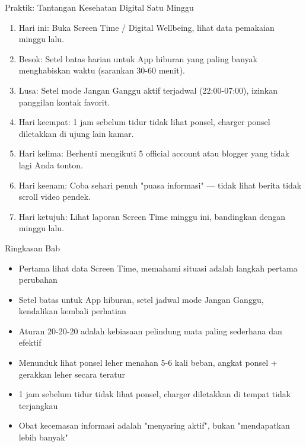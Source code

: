 \begin{tcbpractice}{Praktik: Tantangan Kesehatan Digital Satu Minggu}
\begin{enumerate}
  \item Hari ini: Buka Screen Time / Digital Wellbeing, lihat data pemakaian minggu lalu.
  \item Besok: Setel batas harian untuk App hiburan yang paling banyak menghabiskan waktu (sarankan 30-60 menit).
  \item Lusa: Setel mode Jangan Ganggu aktif terjadwal (22:00-07:00), izinkan panggilan kontak favorit.
  \item Hari keempat: 1 jam sebelum tidur tidak lihat ponsel, charger ponsel diletakkan di ujung lain kamar.
  \item Hari kelima: Berhenti mengikuti 5 official account atau blogger yang tidak lagi Anda tonton.
  \item Hari keenam: Coba sehari penuh "puasa informasi" — tidak lihat berita tidak scroll video pendek.
  \item Hari ketujuh: Lihat laporan Screen Time minggu ini, bandingkan dengan minggu lalu.
\end{enumerate}

\end{tcbpractice}

\begin{tcbsummary}{Ringkasan Bab}
\begin{itemize}
  \item Pertama lihat data Screen Time, memahami situasi adalah langkah pertama perubahan
  \item Setel batas untuk App hiburan, setel jadwal mode Jangan Ganggu, kendalikan kembali perhatian
  \item Aturan 20-20-20 adalah kebiasaan pelindung mata paling sederhana dan efektif
  \item Menunduk lihat ponsel leher menahan 5-6 kali beban, angkat ponsel + gerakkan leher secara teratur
  \item 1 jam sebelum tidur tidak lihat ponsel, charger diletakkan di tempat tidak terjangkau
  \item Obat kecemasan informasi adalah "menyaring aktif", bukan "mendapatkan lebih banyak"
\end{itemize}

\end{tcbsummary}

